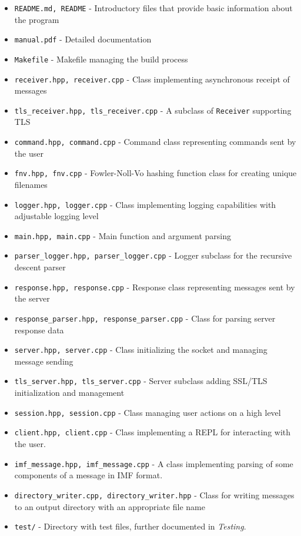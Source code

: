 \documentclass[a4]{report}
\begin{document}
\begin{itemize}
\item \texttt{README.md, README} - Introductory files that provide basic information about the program
\item \texttt{manual.pdf} - Detailed documentation
\item \texttt{Makefile} - Makefile managing the build process
\item \texttt{receiver.hpp, receiver.cpp} - Class implementing asynchronous receipt of messages
\item \texttt{tls\_receiver.hpp, tls\_receiver.cpp} - A subclass of \texttt{Receiver} supporting TLS
\item \texttt{command.hpp, command.cpp} - Command class representing commands sent by the user
\item \texttt{fnv.hpp, fnv.cpp} - Fowler-Noll-Vo\cite{eastlake-fnv-29} hashing function class for creating unique filenames
\item \texttt{logger.hpp, logger.cpp} - Class implementing logging capabilities with adjustable logging level
\item \texttt{main.hpp, main.cpp} - Main function and argument parsing
\item \texttt{parser\_logger.hpp, parser\_logger.cpp} - Logger subclass for the recursive descent parser
\item \texttt{response.hpp, response.cpp} - Response class representing messages sent by the server
\item \texttt{response\_parser.hpp, response\_parser.cpp} - Class for parsing server response data
\item \texttt{server.hpp, server.cpp} - Class initializing the socket and managing message sending
\item \texttt{tls\_server.hpp, tls\_server.cpp} - Server subclass adding SSL/TLS initialization and management
\item \texttt{session.hpp, session.cpp} - Class managing user actions on a high level
\item \texttt{client.hpp, client.cpp} - Class implementing a REPL for interacting with the user.
\item \texttt{imf\_message.hpp, imf\_message.cpp} - A class implementing parsing of some components of a message in IMF format.
\item \texttt{directory\_writer.cpp, directory\_writer.hpp} - Class for writing messages to an output directory with an appropriate file name
\item \texttt{test/} - Directory with test files, further documented in \textit{Testing}.
\end{itemize}
\end{document}
